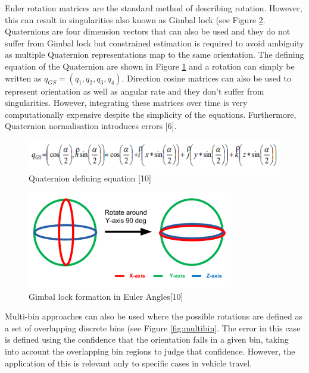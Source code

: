 \documentclass[10pt]{report}
\begin{document}
Euler rotation matrices are the standard method of describing rotation. However, this can result in singularities also known as Gimbal lock (see Figure \ref{fig:euler}. Quaternions are four dimension vectors that can also be used and they do not suffer from Gimbal lock but constrained estimation is required to avoid ambiguity as multiple Quaternion representations map to the same orientation. The defining equation of the Quaternion are shown in Figure \ref{fig:quat_equat} and a rotation can simply be written as $q_{GS}=(q_1,q_2,q_3,q_4)$. Direction cosine matrices can also be used to represent orientation as well as angular rate and they don’t suffer from singularities. However, integrating these matrices over time is very computationally expensive despite the simplicity of the equations. Furthermore, Quaternion normalisation introduces errors [6].

\begin{figure}[!h]
  \caption{Quaternion defining equation [10]}
  \centering
  \label{fig:quat_equat}
  \includegraphics[width=1\textwidth]{quat_equat.PNG}
\end{figure}

\begin{figure}[!h]
  \caption{Gimbal lock formation in Euler Angles[10]}
  \label{fig:euler}
  \includegraphics[width=0.8\textwidth]{eulerandgimbal.PNG}
\end{figure}

Multi-bin approaches can also be used where the possible rotations are defined as a set of overlapping discrete bins (see Figure \ref{fig:multibin}. The error in this case is defined using the confidence that the orientation falls in a given bin, taking into account the overlapping bin regions to judge that confidence. However, the application of this is relevant only to specific cases in vehicle travel.
\end{document}
